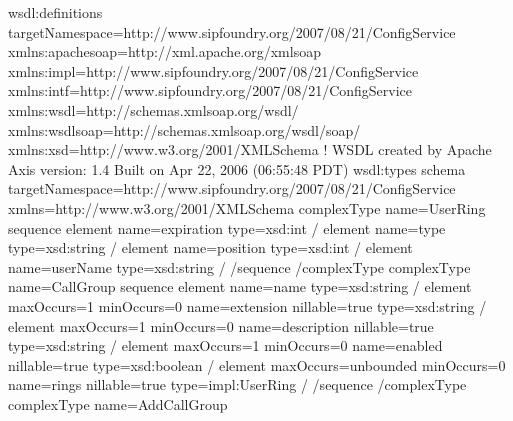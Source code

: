 \documentclass[letterpaper,10pt,english]{sphinxmanual}
\begin{document}

\begin{sphinxVerbatim}[commandchars=\\\{\}]
\PYGZlt{}wsdl:definitions targetNamespace=\PYGZdq{}http://www.sipfoundry.org/2007/08/21/ConfigService\PYGZdq{} xmlns:apachesoap=\PYGZdq{}http://xml.apache.org/xml\PYGZhy{}soap\PYGZdq{} xmlns:impl=\PYGZdq{}http://www.sipfoundry.org/2007/08/21/ConfigService\PYGZdq{} xmlns:intf=\PYGZdq{}http://www.sipfoundry.org/2007/08/21/ConfigService\PYGZdq{} xmlns:wsdl=\PYGZdq{}http://schemas.xmlsoap.org/wsdl/\PYGZdq{} xmlns:wsdlsoap=\PYGZdq{}http://schemas.xmlsoap.org/wsdl/soap/\PYGZdq{} xmlns:xsd=\PYGZdq{}http://www.w3.org/2001/XMLSchema\PYGZdq{}\PYGZgt{}
\PYGZlt{}!\PYGZhy{}\PYGZhy{}
WSDL created by Apache Axis version: 1.4
Built on Apr 22, 2006 (06:55:48 PDT)
\PYGZhy{}\PYGZhy{}\PYGZgt{}
\PYGZlt{}wsdl:types\PYGZgt{}
\PYGZlt{}schema targetNamespace=\PYGZdq{}http://www.sipfoundry.org/2007/08/21/ConfigService\PYGZdq{} xmlns=\PYGZdq{}http://www.w3.org/2001/XMLSchema\PYGZdq{}\PYGZgt{}
\PYGZlt{}complexType name=\PYGZdq{}UserRing\PYGZdq{}\PYGZgt{}
\PYGZlt{}sequence\PYGZgt{}
\PYGZlt{}element name=\PYGZdq{}expiration\PYGZdq{} type=\PYGZdq{}xsd:int\PYGZdq{} /\PYGZgt{}
\PYGZlt{}element name=\PYGZdq{}type\PYGZdq{} type=\PYGZdq{}xsd:string\PYGZdq{} /\PYGZgt{}
\PYGZlt{}element name=\PYGZdq{}position\PYGZdq{} type=\PYGZdq{}xsd:int\PYGZdq{} /\PYGZgt{}
\PYGZlt{}element name=\PYGZdq{}userName\PYGZdq{} type=\PYGZdq{}xsd:string\PYGZdq{} /\PYGZgt{}
\PYGZlt{}/sequence\PYGZgt{}
\PYGZlt{}/complexType\PYGZgt{}
\PYGZlt{}complexType name=\PYGZdq{}CallGroup\PYGZdq{}\PYGZgt{}
\PYGZlt{}sequence\PYGZgt{}
\PYGZlt{}element name=\PYGZdq{}name\PYGZdq{} type=\PYGZdq{}xsd:string\PYGZdq{} /\PYGZgt{}
\PYGZlt{}element maxOccurs=\PYGZdq{}1\PYGZdq{} minOccurs=\PYGZdq{}0\PYGZdq{} name=\PYGZdq{}extension\PYGZdq{} nillable=\PYGZdq{}true\PYGZdq{} type=\PYGZdq{}xsd:string\PYGZdq{} /\PYGZgt{}
\PYGZlt{}element maxOccurs=\PYGZdq{}1\PYGZdq{} minOccurs=\PYGZdq{}0\PYGZdq{} name=\PYGZdq{}description\PYGZdq{} nillable=\PYGZdq{}true\PYGZdq{} type=\PYGZdq{}xsd:string\PYGZdq{} /\PYGZgt{}
\PYGZlt{}element maxOccurs=\PYGZdq{}1\PYGZdq{} minOccurs=\PYGZdq{}0\PYGZdq{} name=\PYGZdq{}enabled\PYGZdq{} nillable=\PYGZdq{}true\PYGZdq{} type=\PYGZdq{}xsd:boolean\PYGZdq{} /\PYGZgt{}
\PYGZlt{}element maxOccurs=\PYGZdq{}unbounded\PYGZdq{} minOccurs=\PYGZdq{}0\PYGZdq{} name=\PYGZdq{}rings\PYGZdq{} nillable=\PYGZdq{}true\PYGZdq{} type=\PYGZdq{}impl:UserRing\PYGZdq{} /\PYGZgt{}
\PYGZlt{}/sequence\PYGZgt{}
\PYGZlt{}/complexType\PYGZgt{}
\PYGZlt{}complexType name=\PYGZdq{}AddCallGroup\PYGZdq{}\PYGZgt{}

\end{sphinxVerbatim}
\end{document}
